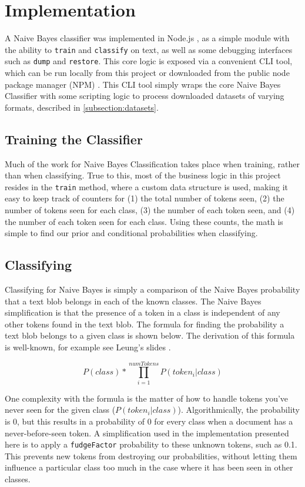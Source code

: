 \section{Implementation}
\label{section:implementation}
A Naive Bayes classifier was implemented in Node.js \cite{node}, as a simple module with the ability to \texttt{train}
and \texttt{classify} on text, as well as some debugging interfaces such as \texttt{dump} and \texttt{restore}. This
core logic is exposed via a convenient CLI tool, which can be run locally from this project or downloaded from the
public node package manager (NPM) \cite{rdn-naive-bayes}. This CLI tool simply wraps the core Naive Bayes Classifier
with some scripting logic to process downloaded datasets of varying formats, described in \ref{subsection:datasets}.

\subsection{Training the Classifier}
\label{subsection:training}
Much of the work for Naive Bayes Classification takes place when training, rather than when classifying. True to this,
most of the business logic in this project resides in the \texttt{train} method, where a custom data structure is used,
making it easy to keep track of counters for (1) the total number of tokens seen, (2) the number of tokens seen for each
class, (3) the number of each token seen, and (4) the number of each token seen for each class. Using these counts,
the math is simple to find our prior and conditional probabilities when classifying.

\subsection{Classifying}
\label{subsection:classifying}
Classifying for Naive Bayes is simply a comparison of the Naive Bayes probability that a text blob belongs in each of
the known classes. The Naive Bayes simplification is that the presence of a token in a class is independent of any
other tokens found in the text blob. The formula for finding the probability a text blob belongs to a given class is
shown below. The derivation of this formula is well-known, for example see Leung's slides \cite{naive-bayes-slides}.

\begin{equation}
P(class)*\prod_{i=1}^{numTokens} P(token_i | class)
\end{equation}

One complexity with the formula is the matter of how to handle tokens you've never seen for the given
class (\begin{math}P(token_i | class)\end{math}). Algorithmically, the probability is 0, but this results in a
probability of 0 for every class when a document has a never-before-seen token. A simplification used in the
implementation presented here is to apply a \texttt{fudgeFactor} probability to these unknown tokens, such as 0.1.
This prevents new tokens from destroying our probabilities, without letting them influence a particular class too much
in the case where it has been seen in other classes.

